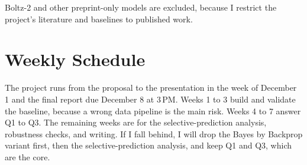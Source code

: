 \documentclass[11pt]{article}
\begin{document}
Boltz-2 and other preprint-only models are excluded, because I restrict the project's literature and baselines to published work.

\section*{Weekly Schedule}

The project runs from the proposal to the presentation in the week of December 1 and the final report due December 8 at 3\,PM. Weeks 1 to 3 build and validate the baseline, because a wrong data pipeline is the main risk. Weeks 4 to 7 answer Q1 to Q3. The remaining weeks are for the selective-prediction analysis, robustness checks, and writing. If I fall behind, I will drop the Bayes by Backprop variant first, then the selective-prediction analysis, and keep Q1 and Q3, which are the core.
\end{document}

